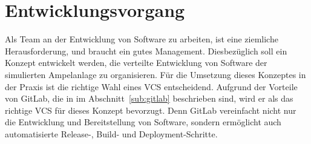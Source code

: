 \section{Entwicklungsvorgang}

Als Team an der Entwicklung von Software zu arbeiten, ist eine ziemliche Herausforderung, und braucht ein gutes Management. Diesbezüglich soll ein Konzept entwickelt werden, die verteilte Entwicklung von Software der simulierten Ampelanlage zu organisieren. 
\newline\newline
Für die Umsetzung dieses Konzeptes in der Praxis ist die richtige Wahl eines VCS entscheidend. Aufgrund der Vorteile von GitLab, die in im Abschnitt~\ref{sub:gitlab} beschrieben sind, wird er als das richtige VCS für dieses Konzept bevorzugt. Denn GitLab vereinfacht nicht nur die Entwicklung und Bereitstellung von Software, sondern ermöglicht auch automatisierte Release-, Build- und Deployment-Schritte.
